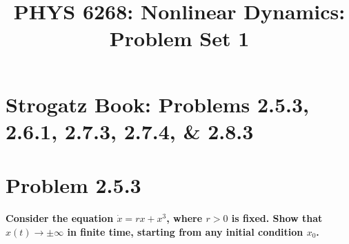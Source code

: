 \documentclass[draft]{agujournal2019}
\begin{document}
\SetSinglespace{}
\title{PHYS 6268: Nonlinear Dynamics: Problem Set 1}




\section*{Strogatz Book: Problems 2.5.3, 2.6.1, 2.7.3, 2.7.4, \& 2.8.3}


\section{Problem 2.5.3}
\label{sec:p1}



\textbf{Consider the equation $\dot x = rx + x^3$, where $r>0$ is fixed. Show that $x(t)\longrightarrow\pm\infty$ in finite time, starting from any initial condition $x_0$.}
\par
\end{document}

